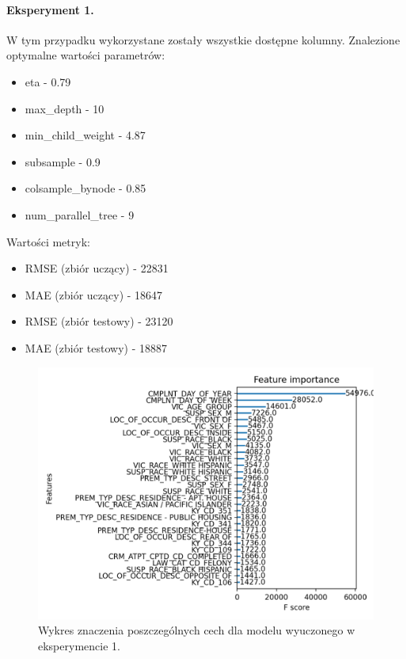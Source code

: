 \documentclass{classrep}
\begin{document}
{{{                \paragraph{Eksperyment 1.} W tym przypadku wykorzystane zostały wszystkie dostępne kolumny. Znalezione optymalne wartości parametrów:
                \begin{itemize}
                    \item eta - 0.79
                    \item max\_depth - 10
                    \item min\_child\_weight - 4.87
                    \item subsample - 0.9
                    \item colsample\_bynode - 0.85
                    \item num\_parallel\_tree - 9
                \end{itemize}
                Wartości metryk:
                \begin{itemize}
                    \item RMSE (zbiór uczący) - 22831
                    \item MAE (zbiór uczący) - 18647
                    \item RMSE (zbiór testowy) - 23120
                    \item MAE (zbiór testowy) - 18887
                \end{itemize}
                \begin{figure}[!htbp]
                    \centering
                    \includegraphics[width=\textwidth]{img/importance_1.png}
                    \caption{Wykres znaczenia poszczególnych cech dla modelu wyuczonego w eksperymencie 1.}
                    \label{importance_1}
                \end{figure}
                \FloatBarrier
                
}}}
\end{document}
